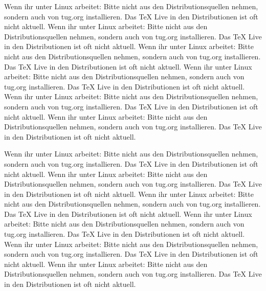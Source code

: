 \documentclass[ngerman,12pt,parskip=half]{scrreprt}
\begin{document}
Wenn ihr unter Linux arbeitet: Bitte nicht aus den Distributionsquellen nehmen, sondern auch von tug.org installieren. Das TeX Live in den Distributionen ist oft nicht aktuell. Wenn ihr unter Linux arbeitet: Bitte nicht aus den Distributionsquellen nehmen, sondern auch von tug.org installieren. Das TeX Live in den Distributionen ist oft nicht aktuell. Wenn ihr unter Linux arbeitet: Bitte nicht aus den Distributionsquellen nehmen, sondern auch von tug.org installieren. Das TeX Live in den Distributionen ist oft nicht aktuell. Wenn ihr unter Linux arbeitet: Bitte nicht aus den Distributionsquellen nehmen, sondern auch von tug.org installieren. Das TeX Live in den Distributionen ist oft nicht aktuell. Wenn ihr unter Linux arbeitet: Bitte nicht aus den Distributionsquellen nehmen, sondern auch von tug.org installieren. Das TeX Live in den Distributionen ist oft nicht aktuell. Wenn ihr unter Linux arbeitet: Bitte nicht aus den Distributionsquellen nehmen, sondern auch von tug.org installieren. Das TeX Live in den Distributionen ist oft nicht aktuell.

Wenn ihr unter Linux arbeitet: Bitte nicht aus den Distributionsquellen nehmen, sondern auch von tug.org installieren. Das TeX Live in den Distributionen ist oft nicht aktuell. Wenn ihr unter Linux arbeitet: Bitte nicht aus den Distributionsquellen nehmen, sondern auch von tug.org installieren. Das TeX Live in den Distributionen ist oft nicht aktuell. Wenn ihr unter Linux arbeitet: Bitte nicht aus den Distributionsquellen nehmen, sondern auch von tug.org installieren. Das TeX Live in den Distributionen ist oft nicht aktuell. Wenn ihr unter Linux arbeitet: Bitte nicht aus den Distributionsquellen nehmen, sondern auch von tug.org installieren. Das TeX Live in den Distributionen ist oft nicht aktuell. Wenn ihr unter Linux arbeitet: Bitte nicht aus den Distributionsquellen nehmen, sondern auch von tug.org installieren. Das TeX Live in den Distributionen ist oft nicht aktuell. Wenn ihr unter Linux arbeitet: Bitte nicht aus den Distributionsquellen nehmen, sondern auch von tug.org installieren. Das TeX Live in den Distributionen ist oft nicht aktuell.
\end{document}
